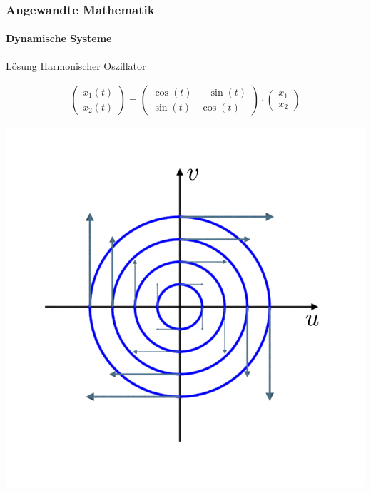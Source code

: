 \documentclass{beamer}
\begin{document}
 \begin{frame}
    \frametitle{Angewandte Mathematik}
\framesubtitle{Dynamische Systeme }

\begin{block}{Lösung Harmonischer Oszillator}
  
    \begin{align*}
        \begin{pmatrix}
            x_1(t) \\ x_2(t)
        \end{pmatrix} = \begin{pmatrix}
            \cos(t) & -\sin(t)  \\ \sin(t) & \cos(t)
        \end{pmatrix}   \cdot \begin{pmatrix}
            x_1\\ x_2
        \end{pmatrix}
    \end{align*}
\end{block}
\center
\includegraphics[scale=0.25]{images/harmonicoszillatorphasespace}
 \end{frame}
\end{document}
